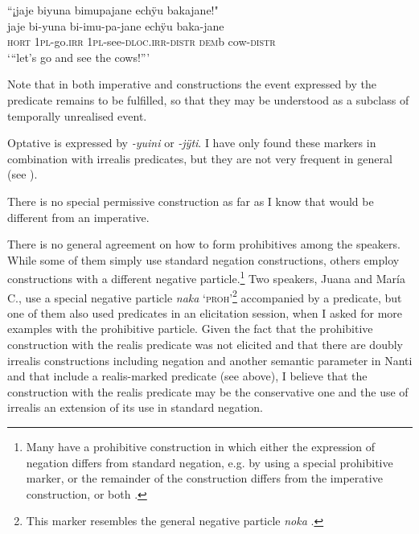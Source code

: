\ea\label{ex:HORT-IRR}
\begingl 
\glpreamble “¡jaje biyuna bimupajane echÿu bakajane!"\\
\gla jaje bi-yuna bi-imu-pa-jane echÿu baka-jane\\ 
\glb \textsc{hort} 1\textsc{pl}-go.\textsc{irr} 1\textsc{pl}-see-\textsc{dloc.irr}-\textsc{distr} \textsc{dem}b cow-\textsc{distr}\\ 
\glft ‘“let’s go and see the cows!”’\\ 
\endgl
 \trailingcitation{[mxx-n151017l-1.38]}
\xe

Note that in both imperative and  constructions the event expressed by the predicate remains to be fulfilled, so that they may be understood as a subclass of temporally unrealised event.

Optative is expressed by \textit{-yuini} or \textit{-jÿti}. I have only found these markers in combination with irrealis predicates, but they are not very frequent in general (see ).

There is no special permissive construction as far as I know that would be different from an imperative.

There is no general agreement on how to form prohibitives among the speakers. While some of them simply use standard negation constructions, others employ constructions with a different negative particle.\footnote{Many  have a prohibitive construction in which either the expression of negation differs from standard negation, e.g. by using a special prohibitive marker, or the remainder of the construction differs from the imperative construction, or both \citep[270--271]{Michael2014b}.} 
Two speakers, Juana and María C., use a special negative particle \textit{naka} ‘\textsc{proh}’\footnote{This marker resembles the  general negative particle \textit{noka} \citep[cf.][338]{Danielsen2007}. } accompanied by a  predicate, but one of them also used  predicates in an elicitation session, when I asked for more examples with the prohibitive particle. Given the fact that the prohibitive construction with the realis predicate was not elicited and that there are doubly irrealis constructions including negation and another semantic parameter in Nanti and  that include a realis-marked predicate (see  above), I believe that the construction with the realis predicate may be the conservative one and the use of irrealis an extension of its use in standard negation.

